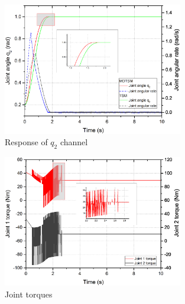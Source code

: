 \documentclass[3p]{elsarticle}
\theoremstyle{plain}
\theoremstyle{remark}
\begin{document}
\begin{figure}
\centering
\includegraphics[width=0.7\textwidth]{paper3_fig5.eps}
\caption{Response of $q_2$ channel}
\label{Figure:5}
\end{figure}

\begin{figure}
\centering
\includegraphics[width=0.7\textwidth]{paper3_torque.eps}
\caption{Joint torques}
\label{Figure:torque}
\end{figure}
\end{document}
